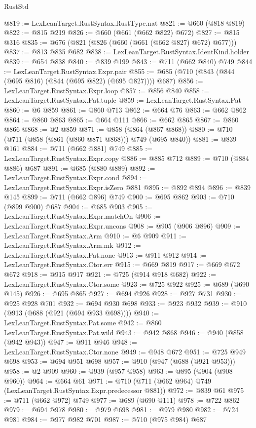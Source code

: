 \begin{lexlean}{RustStd}
\begin{coremodule}
@819 := LexLeanTarget.RustSyntax.RustType.nat
@821 := @660 (@818 @819)
@822 := @815 @219
@826 := @660 (@661 (@662 @822) @672)
@827 := @815 @316
@835 := @676 (@821 (@826 (@660 (@661 (@662 @827) @672) @677)))
@837 := @813 @835 @682
@838 := LexLeanTarget.RustSyntax.IdentKind.holder
@839 := @654 @838
@840 := @839 @199
@843 := @711 (@662 @840) @749
@844 := LexLeanTarget.RustSyntax.Expr.pair
@855 := @685 (@710 (@843 (@844 (@695 @816) (@844 (@695 @822) (@695 @827)))) @687)
@856 := LexLeanTarget.RustSyntax.Expr.loop
@857 := @856 @840
@858 := LexLeanTarget.RustSyntax.Pat.tuple
@859 := LexLeanTarget.RustSyntax.Pat
@860 := @6 @859
@861 := @860 @713
@862 := @664 @76
@863 := @662 @862
@864 := @860 @863
@865 := @664 @111
@866 := @662 @865
@867 := @860 @866
@868 := @2 @859
@871 := @858 (@864 (@867 @868))
@880 := @710 (@711 (@858 (@861 (@860 @871 @868))) @749 (@695 @840))
@881 := @839 @161
@884 := @711 (@662 @881) @749
@885 := LexLeanTarget.RustSyntax.Expr.copy
@886 := @885 @712
@889 := @710 (@884 @886) @687
@891 := @685 (@880 @889)
@892 := LexLeanTarget.RustSyntax.Expr.cond
@894 := LexLeanTarget.RustSyntax.Expr.isZero @881
@895 := @892 @894
@896 := @839 @145
@899 := @711 (@662 @896) @749
@900 := @695 @862
@903 := @710 (@899 @900) @687
@904 := @685 @903
@905 := LexLeanTarget.RustSyntax.Expr.matchOn
@906 := LexLeanTarget.RustSyntax.Expr.uncons
@908 := @905 (@906 @896)
@909 := LexLeanTarget.RustSyntax.Arm
@910 := @6 @909
@911 := LexLeanTarget.RustSyntax.Arm.mk
@912 := LexLeanTarget.RustSyntax.Pat.none
@913 := @911 @912
@914 := LexLeanTarget.RustSyntax.Ctor.err
@915 := @669 @819
@917 := @669 @672 @672
@918 := @915 @917
@921 := @725 (@914 @918 @682)
@922 := LexLeanTarget.RustSyntax.Ctor.some
@923 := @725 @922
@925 := @689 (@690 @145)
@926 := @695 @865
@927 := @694 @926
@928 := @927 @731
@930 := @925 @928 @701
@932 := @694 @930 @698
@933 := @923 @932
@939 := @910 (@913 (@688 (@921 (@694 @933 @698))))
@940 := LexLeanTarget.RustSyntax.Pat.some
@942 := @860 LexLeanTarget.RustSyntax.Pat.wild
@943 := @942 @868
@946 := @940 (@858 (@942 @943))
@947 := @911 @946
@948 := LexLeanTarget.RustSyntax.Ctor.none
@949 := @948 @672
@951 := @725 @949 @698
@953 := @694 @951 @698
@957 := @910 (@947 (@688 (@921 @953)))
@958 := @2 @909
@960 := @939 (@957 @958)
@963 := @895 (@904 (@908 @960))
@964 := @664 @61
@971 := @710 (@711 (@662 @964) @749 (LexLeanTarget.RustSyntax.Expr.predecessor @881))
@972 := @839 @61
@975 := @711 (@662 @972) @749
@977 := @689 (@690 @111)
@978 := @722 @862
@979 := @694 @978
@980 := @979 @698
@981 := @979 @980
@982 := @724 @981
@984 := @977 @982 @701
@987 := @710 (@975 @984) @687

\end{coremodule}
\end{lexlean}
